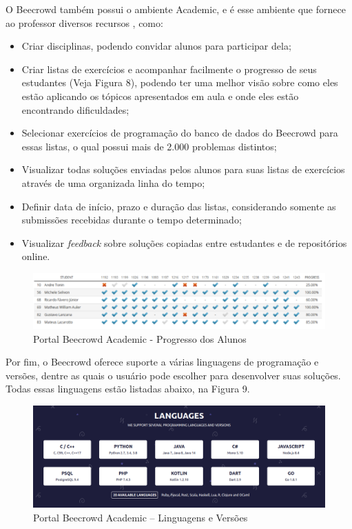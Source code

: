 O Beecrowd também possui o ambiente Academic, e é esse ambiente que fornece ao professor diversos recursos \cite{beecrowdacademic}, como:

\begin{itemize}
    \item Criar disciplinas, podendo convidar alunos para participar dela;
    \item Criar listas de exercícios e acompanhar facilmente o progresso de seus estudantes (Veja Figura 8), podendo ter uma melhor visão sobre como eles estão aplicando os tópicos apresentados em aula e onde eles estão encontrando dificuldades;
    \item Selecionar exercícios de programação do banco de dados do Beecrowd para essas listas, o qual possui mais de 2.000 problemas distintos;
    \item Visualizar todas soluções enviadas pelos alunos para suas listas de exercícios através de uma organizada linha do tempo;
    \item Definir data de início, prazo e duração das listas, considerando somente as submissões recebidas durante o tempo determinado;
    \item Visualizar \textit{feedback} sobre soluções copiadas entre estudantes e de repositórios online.
\end{itemize}

\begin{figure}[h!]
	   \centering
            \caption{Portal Beecrowd Academic - Progresso dos Alunos}
            \label{fig:ModeloConceitual}
	   	\includegraphics[scale=0.3]{pictures/beecrowd_academic_progresso.png}
\end{figure}

Por fim, o Beecrowd oferece suporte a várias linguagens de programação e versões, dentre as quais o usuário pode escolher para desenvolver suas soluções. Todas essas linguagens estão listadas abaixo, na Figura 9.

\begin{figure}[h!]
	   \centering
            \caption{Portal Beecrowd Academic – Linguagens e Versões}
            \label{fig:ModeloConceitual}
	   	\includegraphics[scale=0.3]{pictures/beecrowd_academic_linguagens.png}
\end{figure}


